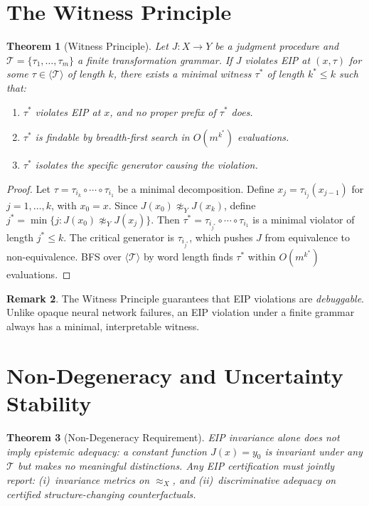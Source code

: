 \documentclass[12pt,letterpaper]{article}
\newtheorem{theorem}{Theorem}[section]
\theoremstyle{definition}
\newtheorem{remark}[theorem]{Remark}
\theoremstyle{plain}
\newcommand{\calT}{\mathcal{T}}
\newcommand{\genT}{\langle \mathcal{T} \rangle}
\newcommand{\equivX}{\approx_X}
\newcommand{\equivY}{\approx_Y}
\begin{document}
\section{The Witness Principle}
\label{sec:thm-witness}

\begin{theorem}[Witness Principle]
\label{thm:witness}
Let $J: X \to Y$ be a judgment procedure and $\calT = \{\tau_1, \ldots, \tau_m\}$ a finite transformation grammar. If $J$ violates EIP at $(x, \tau)$ for some $\tau \in \genT$ of length $k$, there exists a minimal witness $\tau^*$ of length $k^* \leq k$ such that:
\begin{enumerate}[label=(\roman*)]
    \item $\tau^*$ violates EIP at $x$, and no proper prefix of $\tau^*$ does.
    \item $\tau^*$ is findable by breadth-first search in $O(m^{k^*})$ evaluations.
    \item $\tau^*$ isolates the specific generator causing the violation.
\end{enumerate}
\end{theorem}

\begin{proof}
Let $\tau = \tau_{i_k} \circ \cdots \circ \tau_{i_1}$ be a minimal decomposition. Define $x_j = \tau_{i_j}(x_{j-1})$ for $j = 1, \ldots, k$, with $x_0 = x$. Since $J(x_0) \not\equivY J(x_k)$, define $j^* = \min\{j : J(x_0) \not\equivY J(x_j)\}$. Then $\tau^* = \tau_{i_{j^*}} \circ \cdots \circ \tau_{i_1}$ is a minimal violator of length $j^* \leq k$. The critical generator is $\tau_{i_{j^*}}$, which pushes $J$ from equivalence to non-equivalence. BFS over $\genT$ by word length finds $\tau^*$ within $O(m^{k^*})$ evaluations.
\end{proof}

\begin{remark}
The Witness Principle guarantees that EIP violations are \emph{debuggable}. Unlike opaque neural network failures, an EIP violation under a finite grammar always has a minimal, interpretable witness.
\end{remark}


\section{Non-Degeneracy and Uncertainty Stability}
\label{sec:thm-nondeg}

\begin{theorem}[Non-Degeneracy Requirement]
\label{thm:nondeg}
EIP invariance alone does not imply epistemic adequacy: a constant function $J(x) = y_0$ is invariant under any $\calT$ but makes no meaningful distinctions. Any EIP certification must jointly report: (i)~invariance metrics on $\equivX$, and (ii)~discriminative adequacy on certified structure-changing counterfactuals.
\end{theorem}
\end{document}
